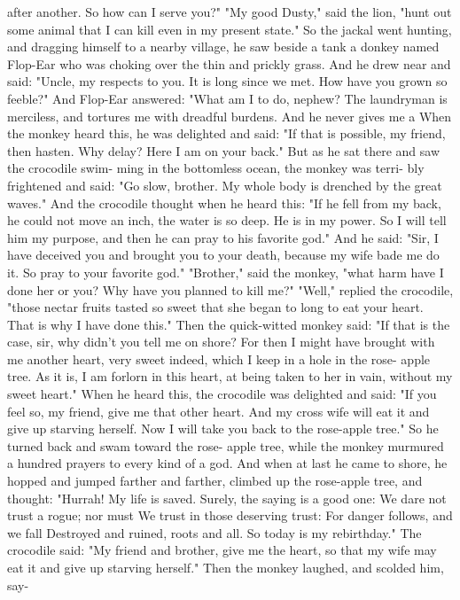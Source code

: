 \documentclass{book}
\begin{document}
after another. So how can I serve you?" "My good
Dusty," said the lion, "hunt out some animal that
I can kill even in my present state."
So the jackal went hunting, and dragging himself
to a nearby village, he saw beside a tank a donkey
named Flop-Ear who was choking over the thin and
prickly grass. And he drew near and said: "Uncle,
my respects to you. It is long since we met. How
have you grown so feeble?"
And Flop-Ear answered: "What am I to do,
nephew? The laundryman is merciless, and tortures
me with dreadful burdens. And he never gives me a
When the monkey heard this, he was delighted
and said: "If that is possible, my friend, then hasten.
Why delay? Here I am on your back."
But as he sat there and saw the crocodile swim-
ming in the bottomless ocean, the monkey was terri-
bly frightened and said: "Go slow, brother. My
whole body is drenched by the great waves."
And the crocodile thought when he heard this:
"If he fell from my back, he could not move an inch,
the water is so deep. He is in my power. So I will
tell him my purpose, and then he can pray to his
favorite god."
And he said: "Sir, I have deceived you and
brought you to your death, because my wife bade
me do it. So pray to your favorite god."
"Brother," said the monkey, "what harm have I
done her or you? Why have you planned to kill
me?"
"Well," replied the crocodile, "those nectar fruits
tasted so sweet that she began to long to eat your
heart. That is why I have done this."
Then the quick-witted monkey said: "If that is
the case, sir, why didn't you tell me on shore? For
then I might have brought with me another heart,
very sweet indeed, which I keep in a hole in the rose-
apple tree. As it is, I am forlorn in this heart, at
being taken to her in vain, without my sweet heart."
When he heard this, the crocodile was delighted
and said: "If you feel so, my friend, give me that
other heart. And my cross wife will eat it and give
up starving herself. Now I will take you back to the
rose-apple tree."
So he turned back and swam toward the rose-
apple tree, while the monkey murmured a hundred
prayers to every kind of a god. And when at last he
came to shore, he hopped and jumped farther and
farther, climbed up the rose-apple tree, and thought:
"Hurrah! My life is saved. Surely, the saying is a
good one:
We dare not trust a rogue; nor must
We trust in those deserving trust:
For danger follows, and we fall
Destroyed and ruined, roots and all.
So today is my rebirthday."
The crocodile said: "My friend and brother,
give me the heart, so that my wife may eat it and give
up starving herself."
Then the monkey laughed, and scolded him, say-
\end{document}
